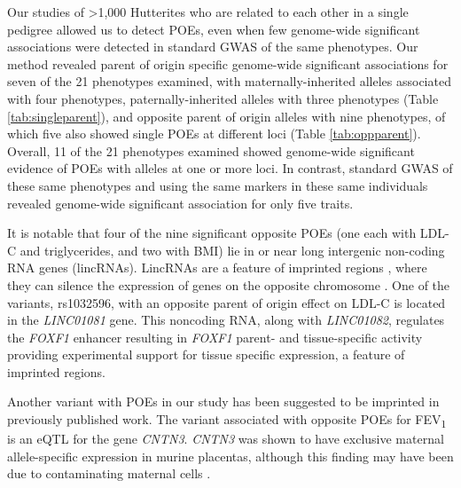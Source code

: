 Our studies of \textgreater1,000 Hutterites who are related to each other in a single pedigree allowed us to detect POEs, even when few genome-wide significant associations were detected in standard GWAS of the same phenotypes. Our method revealed parent of origin specific genome-wide significant associations for seven of the 21 phenotypes examined, with maternally-inherited alleles associated with four phenotypes, paternally-inherited alleles with three phenotypes (Table \ref{tab:singleparent}), and opposite parent of origin alleles with nine phenotypes, of which five also showed single POEs at different loci (Table \ref{tab:oppparent}). Overall, 11 of the 21 phenotypes examined showed genome-wide significant evidence of POEs with alleles at one or more loci. In contrast, standard GWAS of these same phenotypes and using the same markers in these same individuals revealed genome-wide significant association for only five traits. 

It is notable that four of the nine significant opposite POEs (one each with LDL-C and triglycerides, and two with BMI) lie in or near long intergenic non-coding RNA genes (lincRNAs). LincRNAs are a feature of imprinted regions \cite{Peters2014}, where they can silence the expression of genes on the opposite chromosome \cite{Barlow:2014dv,Patten:2016cb}. One of the variants, rs1032596, with an opposite parent of origin effect on LDL-C is located in the \emph{LINC01081} gene. This noncoding RNA, along with \emph{LINC01082}, regulates the \emph{FOXF1} enhancer resulting in \emph{FOXF1} parent- and tissue-specific activity\cite{Szafranski:2016fz} providing experimental support for tissue specific expression, a feature of imprinted regions. 

Another variant with POEs in our study has been suggested to be imprinted in previously published work. The variant associated with opposite POEs for FEV\textsubscript{1} is an eQTL for the gene \emph{CNTN3}. \emph{CNTN3} was shown to have exclusive maternal allele-specific expression in murine placentas\cite{Brideau:2010gz}, although this finding may have been due to contaminating maternal cells \cite{Okae:2011hj,Proudhon:2011eh}. 

